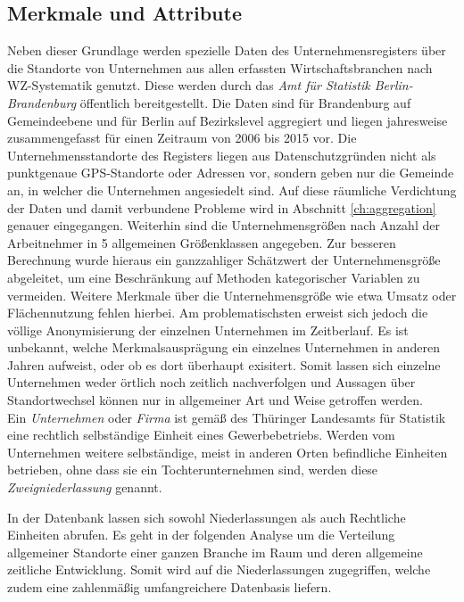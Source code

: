 \subsection{Merkmale und Attribute}
Neben dieser Grundlage werden spezielle Daten des Unternehmensregisters über die Standorte von Unternehmen 
aus allen erfassten Wirtschaftsbranchen nach WZ-Systematik genutzt. 
Diese werden durch das \emph{Amt für Statistik Berlin-Brandenburg} öffentlich bereitgestellt.
Die Daten sind für Brandenburg auf Gemeindeebene und für Berlin auf Bezirkslevel aggregiert 
und liegen jahresweise zusammengefasst für einen Zeitraum von 2006 bis 2015 vor. 
Die Unternehmensstandorte des Registers liegen aus Datenschutzgründen nicht als punktgenaue GPS-Standorte oder Adressen vor, 
sondern geben nur die Gemeinde an, in welcher die Unternehmen angesiedelt sind. 
Auf diese räumliche Verdichtung der Daten und damit verbundene Probleme wird in Abschnitt \ref{ch:aggregation} genauer eingegangen. 
Weiterhin sind die Unternehmensgrößen nach Anzahl der Arbeitnehmer in 5 allgemeinen Größenklassen angegeben. 
Zur besseren Berechnung wurde hieraus ein ganzzahliger Schätzwert der Unternehmensgröße abgeleitet, 
um eine Beschränkung auf Methoden kategorischer Variablen zu vermeiden.  
Weitere Merkmale über die Unternehmensgröße wie etwa Umsatz oder Flächennutzung fehlen hierbei. 
Am problematischsten erweist sich jedoch die völlige Anonymisierung der einzelnen Unternehmen im Zeitberlauf. 
Es ist unbekannt, welche Merkmalsausprägung ein einzelnes Unternehmen in anderen Jahren aufweist, oder ob es dort überhaupt exisitert. 
Somit lassen sich einzelne Unternehmen weder örtlich noch zeitlich nachverfolgen und Aussagen über Standortwechsel können nur in allgemeiner Art und Weise getroffen werden.\\

Ein \emph{Unternehmen} oder \emph{Firma} ist gemäß des Thüringer Landesamts für Statistik eine rechtlich selbständige Einheit eines Gewerbebetriebs. 
Werden vom Unternehmen weitere selbständige, meist in anderen Orten befindliche Einheiten betrieben, 
ohne dass sie ein Tochterunternehmen sind, werden diese \emph{Zweigniederlassung} genannt.

In der Datenbank lassen sich sowohl Niederlassungen als auch Rechtliche Einheiten abrufen. 
Es geht in der folgenden Analyse um die Verteilung allgemeiner Standorte einer ganzen Branche im Raum und deren allgemeine zeitliche Entwicklung. 
Somit wird auf die Niederlassungen zugegriffen, welche zudem eine zahlenmäßig umfangreichere Datenbasis liefern.\\

